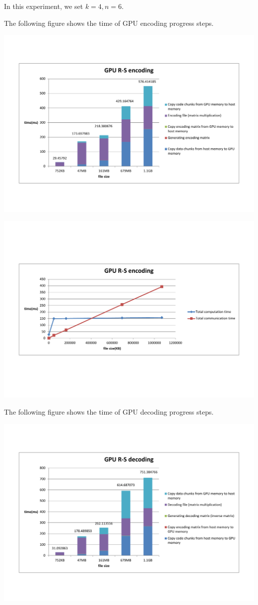 \documentclass[a4paper]{article}
\begin{document}
In this experiment, we set $k=4, n=6$.

The following figure shows the time of GPU encoding progress steps.

\includegraphics[scale=0.48]{result-graph/GPU-encode-steps.pdf}

\includegraphics[scale=0.42]{result-graph/GPU-RS-encode.pdf}

The following figure shows the time of GPU decoding progress steps.

\includegraphics[scale=0.48]{result-graph/GPU-decode-steps.pdf}
\end{document}
